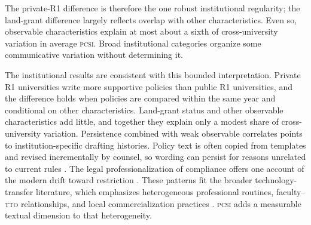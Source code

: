 The private-R1 difference is therefore the one robust institutional regularity; the land-grant difference largely reflects overlap with other characteristics. Even so, observable characteristics explain at most about a sixth of cross-university variation in average \textsc{pcsi}. Broad institutional categories organize some communicative variation without determining it.

%


The institutional results are consistent with this bounded interpretation. Private R1 universities write more supportive policies than public R1 universities, and the difference holds when policies are compared within the same year and conditional on other characteristics. Land-grant status and other observable characteristics add little, and together they explain only a modest share of cross-university variation. Persistence combined with weak observable correlates points to institution-specific drafting histories. Policy text is often copied from templates and revised incrementally by counsel, so wording can persist for reasons unrelated to current rules \citep{kahan1997standardization,choi2013dynamics}. The legal professionalization of compliance offers one account of the modern drift toward restriction \citep{edelman2016working}. These patterns fit the broader technology-transfer literature, which emphasizes heterogeneous professional routines, faculty--\textsc{tto} relationships, and local commercialization practices \citep{owensmith2001patent,siegel2003assessing,markman2005innovation,bercovitz2008academic,siegel2007technology,rothaermel2007university,perkmann2013academic}. \textsc{pcsi} adds a measurable textual dimension to that heterogeneity.

